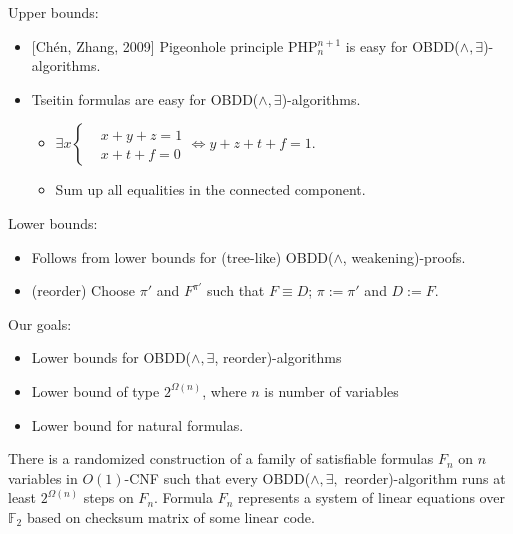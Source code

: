 {
Upper bounds:
\begin{itemize}
\item{} [Ch{\'{e}}n, Zhang, 2009] Pigeonhole principle PHP$^{n+1}_n$ is easy for OBDD($\land, \exists$)-algorithms.
\item Tseitin formulas are easy for OBDD($\land, \exists$)-algorithms.
\begin{itemize}
\item $\exists x \left\{\begin{aligned} &x+y+z=1 \\ &x+t+f=0 \end{aligned}\right.  \iff y+z+t+f=1$.
\item Sum up all equalities in the connected component.   
\end{itemize}
\end{itemize}                        

Lower bounds:
\begin{itemize}
\item Follows from lower bounds for (tree-like) OBDD($\land$, weakening)-proofs.
\end{itemize}
}

{
\begin{itemize}
\item (reorder) Choose $\pi'$ and $F^{\pi'}$ such that $F\equiv D$; $\pi:=\pi'$ and $D:=F$.
\end{itemize}

Our goals:
\begin{itemize}
\item Lower bounds for OBDD($\land, \exists$, reorder)-algorithms
\item Lower bound of type $2^{\Omega(n)}$, where $n$ is number of variables
\item Lower bound for natural formulas.
\end{itemize}

\pause \myth There is a randomized construction of a family of satisfiable formulas $F_n$ on $n$ variables in $O(1)$-CNF such that every
OBDD($\land, \exists, \mbox{ reorder}$)-algorithm runs at least $2^{\Omega(n)}$ steps on $F_n$.
Formula $F_n$ represents a  system of linear equations over $\mathbb{F}_2$
based on checksum matrix of some linear code.
}

